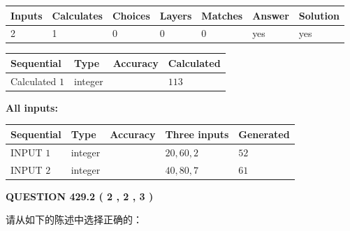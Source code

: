 \documentclass{ctexart}
\begin{document}
 
\noindent{}
 
 

 
   
   
   
   
\noindent\begin{tabular}{|l|l|l|l|l|l|l|}
 \hline
Inputs & Calculates & Choices & Layers & Matches & Answer & Solution \\ \hline
 2  & 
 1  & 
 0
  & 
 0  & 
 0  & 
  yes & 
  yes 
  \\ \hline
 \end{tabular}
   
   
   
   
\noindent{}
   
   
  
  
\noindent\begin{tabular}{|l|l|l|l|}
\hline
 Sequential & Type & Accuracy & Calculated \\ 
\hline
 
 
  Calculated $  1 $ & integer &  & 
  $ 113 $ 
 \\  \hline  
 \end{tabular}
   
   
   
   
\noindent\vspace{0.1in}\hspace{-0.08in} {\textbf{\Large{All inputs: }}}
   
   
  
  
\noindent\begin{tabular}{|l|l|l|l|l|}
\hline
 Sequential & Type & Accuracy & Three inputs & Generated \\ 
\hline
 
 
  INPUT $  1 $ & integer &  & $
 20
 , 
 60
 , 
 2
 $ & $ 52 $ 
 \\  \hline  
 
 
  INPUT $  2 $ & integer &  & $
 40
 , 
 80
 , 
 7
 $ & $ 61 $ 
 \\  \hline  
 \end{tabular}
   
   
  
\vspace{0.2in}
  
{\textbf{\Large{QUESTION
429.2 
 ( 2 , 2 , 3 )
}}}
  
  
请从如下的陈述中选择正确的：
 
\end{document}
